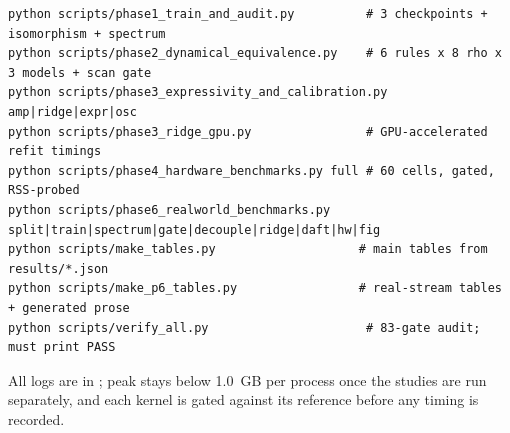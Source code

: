 \documentclass[11pt]{article}
\theoremstyle{definition}
\newcommand{\code}[1]{\texttt{\detokenize{#1}}}
\begin{document}
{\scriptsize
\begin{verbatim}
python scripts/phase1_train_and_audit.py          # 3 checkpoints + isomorphism + spectrum
python scripts/phase2_dynamical_equivalence.py    # 6 rules x 8 rho x 3 models + scan gate
python scripts/phase3_expressivity_and_calibration.py amp|ridge|expr|osc
python scripts/phase3_ridge_gpu.py                # GPU-accelerated refit timings
python scripts/phase4_hardware_benchmarks.py full # 60 cells, gated, RSS-probed
python scripts/phase6_realworld_benchmarks.py split|train|spectrum|gate|decouple|ridge|daft|hw|fig
python scripts/make_tables.py                    # main tables from results/*.json
python scripts/make_p6_tables.py                 # real-stream tables + generated prose
python scripts/verify_all.py                      # 83-gate audit; must print PASS
\end{verbatim}
}

All logs are in \code{results/}; peak \code{RssAnon} stays below 1.0~GB per process once the studies are run
separately, and each kernel is gated against its reference before any timing is recorded.
\end{document}
